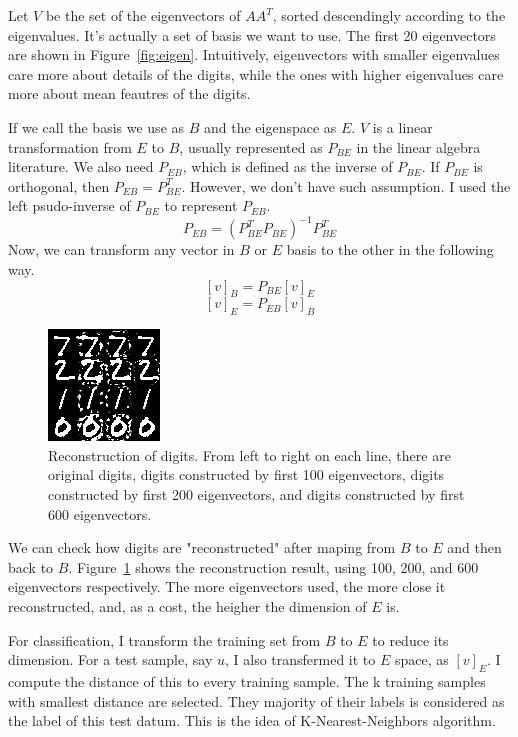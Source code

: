 \documentclass[10pt]{article}
\begin{document}
Let $V$ be the set of the eigenvectors of $AA^T$, sorted descendingly
according to the eigenvalues. It's actually a set of basis we want to
use. The first 20 eigenvectors are shown in Figure~\ref{fig:eigen}.
Intuitively, eigenvectors with smaller eigenvalues care more about
details of the digits, while the ones with higher eigenvalues care
more about mean feautres of the digits.

If we call the basis we use as $B$ and the eigenspace as $E$. $V$
is a linear transformation from $E$ to $B$, usually represented as
$P_{BE}$ in the linear algebra literature. We also need $P_{EB}$,
which is defined as the inverse of $P_{BE}$. If $P_{BE}$ is
orthogonal, then $P_{EB} = P_{BE}^T$.  However, we don't have such
assumption. I used the left psudo-inverse of $P_{BE}$ to represent
$P_{EB}$.
$$P_{EB} = (P_{BE}^T P_{BE})^{-1} P_{BE}^T$$
Now, we can transform any vector in $B$ or $E$ basis to the other in
the following way.
$$[v]_B = P_{BE} [v]_E$$
$$[v]_E = P_{EB} [v]_B$$

\begin{figure}
\centering
\includegraphics[]{test.png}
\caption{Reconstruction of digits. From left to right on each line,
there are original digits, digits constructed by first 100
eigenvectors, digits constructed by first 200 eigenvectors, and digits
constructed by first 600 eigenvectors. }
\label{fig:test}
\end{figure}

We can check how digits are "reconstructed" after maping from $B$ to
$E$ and then back to $B$. Figure~\ref{fig:test} shows the
reconstruction result, using 100, 200, and 600 eigenvectors
respectively. The more eigenvectors used, the more close it
reconstructed, and, as a cost, the heigher the dimension of $E$ is.

For classification, I transform the training set from $B$ to $E$ to
reduce its dimension. For a test sample, say $u$, I also transfermed
it to $E$ space, as $[v]_E$. I compute the distance of this to every
training sample. The k training samples with smallest distance are
selected. They majority of their labels is considered as the label of
this test datum. This is the idea of K-Nearest-Neighbors algorithm.
\end{document}
